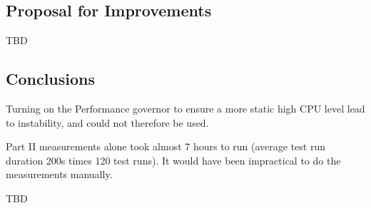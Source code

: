 \documentclass{article}
\begin{document}
\subsection{Proposal for Improvements}
TBD

\subsection{Conclusions}
Turning on the Performance governor to ensure a more static high CPU level lead to instability, and could not therefore be used.

Part II measurements alone took almost 7 hours to run (average test run duration 200s times 120 test runs). It would have been impractical to do the measurements manually.

TBD



\end{document}
